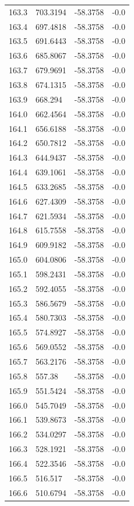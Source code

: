 \begin{table}[H]
\begin{tabular}{llll}
163.3 & 703.3194 & -58.3758 & -0.0 \\
163.4 & 697.4818 & -58.3758 & -0.0 \\
163.5 & 691.6443 & -58.3758 & -0.0 \\
163.6 & 685.8067 & -58.3758 & -0.0 \\
163.7 & 679.9691 & -58.3758 & -0.0 \\
163.8 & 674.1315 & -58.3758 & -0.0 \\
163.9 & 668.294 & -58.3758 & -0.0 \\
164.0 & 662.4564 & -58.3758 & -0.0 \\
164.1 & 656.6188 & -58.3758 & -0.0 \\
164.2 & 650.7812 & -58.3758 & -0.0 \\
164.3 & 644.9437 & -58.3758 & -0.0 \\
164.4 & 639.1061 & -58.3758 & -0.0 \\
164.5 & 633.2685 & -58.3758 & -0.0 \\
164.6 & 627.4309 & -58.3758 & -0.0 \\
164.7 & 621.5934 & -58.3758 & -0.0 \\
164.8 & 615.7558 & -58.3758 & -0.0 \\
164.9 & 609.9182 & -58.3758 & -0.0 \\
165.0 & 604.0806 & -58.3758 & -0.0 \\
165.1 & 598.2431 & -58.3758 & -0.0 \\
165.2 & 592.4055 & -58.3758 & -0.0 \\
165.3 & 586.5679 & -58.3758 & -0.0 \\
165.4 & 580.7303 & -58.3758 & -0.0 \\
165.5 & 574.8927 & -58.3758 & -0.0 \\
165.6 & 569.0552 & -58.3758 & -0.0 \\
165.7 & 563.2176 & -58.3758 & -0.0 \\
165.8 & 557.38 & -58.3758 & -0.0 \\
165.9 & 551.5424 & -58.3758 & -0.0 \\
166.0 & 545.7049 & -58.3758 & -0.0 \\
166.1 & 539.8673 & -58.3758 & -0.0 \\
166.2 & 534.0297 & -58.3758 & -0.0 \\
166.3 & 528.1921 & -58.3758 & -0.0 \\
166.4 & 522.3546 & -58.3758 & -0.0 \\
166.5 & 516.517 & -58.3758 & -0.0 \\
166.6 & 510.6794 & -58.3758 & -0.0 \\

\end{tabular}
\end{table}
